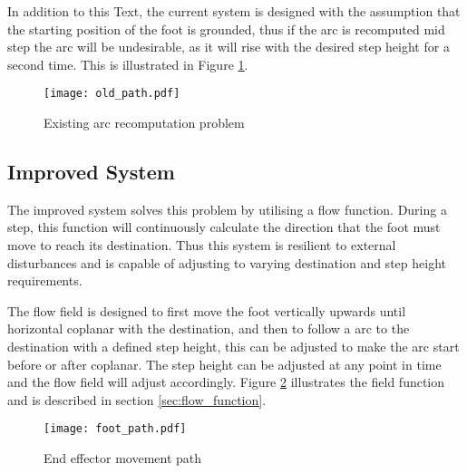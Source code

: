         In addition to this Text, the current system is designed with the assumption that the starting position of the foot is grounded, thus if the arc is recomputed
        mid step the arc will be undesirable, as it will rise with the desired step height for a second time. This is illustrated in Figure \ref{fig:old_arc}.

        \begin{figure}[h]
            \centering
            \hspace{-1.38cm}
            \texttt{[image: old\_path.pdf]}
            \caption{Existing arc recomputation problem}
            \label{fig:old_arc}
        \end{figure}

    \subsection{Improved System}
        The improved system solves this problem by utilising a flow function. During a step, this function will continuously calculate the
        direction that the foot must move to reach its destination. Thus this system is resilient to external disturbances and is capable of adjusting to
        varying destination and step height requirements. 
        
        The flow field is designed to first move the foot vertically upwards until horizontal coplanar with the destination, and then to follow a
        arc to the destination with a defined step height, this can be adjusted to make the arc start before or after coplanar. The step height can be adjusted at any point in time and the flow field will adjust accordingly.
        Figure \ref{fig:foot_arc} illustrates the field function and is described in section \ref{sec:flow_function}.
        \begin{figure}[h]
            \centering
            \hspace{-1.38cm}
            \texttt{[image: foot\_path.pdf]}
            \caption{End effector movement path}
            \label{fig:foot_arc}
        \end{figure}

